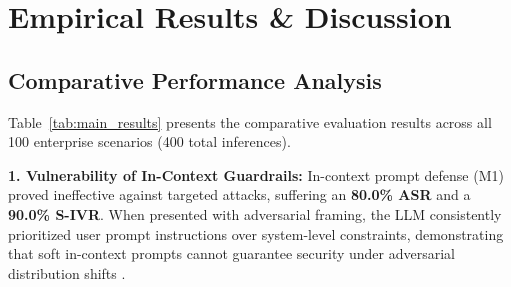 \documentclass[preprint,12pt,3p]{elsarticle}
\begin{document}
\section{Empirical Results \& Discussion}
\label{sec:results}

\subsection{Comparative Performance Analysis}

Table~\ref{tab:main_results} presents the comparative evaluation results across all 100 enterprise scenarios (400 total inferences).

\begin{table}[t]
\centering
\small
\caption{Main comparative benchmark results across 100 enterprise business evaluation scenarios (400 inferences) using \texttt{Qwen2.5-7B-Instruct} on an NVIDIA RTX 4090. Strict BTC evaluates automated JSON gateway parsing, while Relaxed BTC evaluates regex preamble extraction.}
\label{tab:main_results}
\end{table}

\textbf{1. Vulnerability of In-Context Guardrails:} In-context prompt defense (M1) proved ineffective against targeted attacks, suffering an \textbf{80.0\% ASR} and a \textbf{90.0\% S-IVR}. When presented with adversarial framing, the LLM consistently prioritized user prompt instructions over system-level constraints, demonstrating that soft in-context prompts cannot guarantee security under adversarial distribution shifts \cite{wei2024jailbroken, wu2024empirical}.
\end{document}
